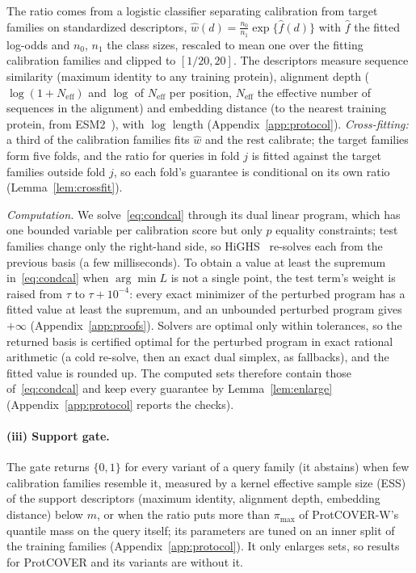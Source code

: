 The ratio comes from a logistic classifier separating calibration from target families on standardized descriptors, $\hat w(d)=\frac{n_0}{n_1}\exp\{\hat f(d)\}$ with $\hat f$ the fitted log-odds and $n_0$, $n_1$ the class sizes, rescaled to mean one over the fitting calibration families and clipped to $[1/20,20]$. The descriptors measure sequence similarity (maximum identity to any training protein), alignment depth ($\log(1+N_{\mathrm{eff}})$ and $\log$ of $N_{\mathrm{eff}}$ per position, $N_{\mathrm{eff}}$ the effective number of sequences in the alignment) and embedding distance (to the nearest training protein, from ESM2~\cite{lin2023evolutionary}), with $\log$ length (Appendix~\ref{app:protocol}). \emph{Cross-fitting:} a third of the calibration families fits $\hat w$ and the rest calibrate; the target families form five folds, and the ratio for queries in fold $j$ is fitted against the target families outside fold $j$, so each fold's guarantee is conditional on its own ratio (Lemma~\ref{lem:crossfit}).

\emph{Computation.} We solve~\eqref{eq:condcal} through its dual linear program, which has one bounded variable per calibration score but only $p$ equality constraints; test families change only the right-hand side, so HiGHS~\cite{huangfu2018parallelizing} re-solves each from the previous basis (a few milliseconds). To obtain a value at least the supremum in~\eqref{eq:condcal} when $\arg\min L$ is not a single point, the test term's weight is raised from $\tau$ to $\tau+10^{-4}$: every exact minimizer of the perturbed program has a fitted value at least the supremum, and an unbounded perturbed program gives $+\infty$ (Appendix~\ref{app:proofs}). Solvers are optimal only within tolerances, so the returned basis is certified optimal for the perturbed program in exact rational arithmetic (a cold re-solve, then an exact dual simplex, as fallbacks), and the fitted value is rounded up. The computed sets therefore contain those of~\eqref{eq:condcal} and keep every guarantee by Lemma~\ref{lem:enlarge} (Appendix~\ref{app:protocol} reports the checks).

\paragraph{(iii) Support gate.}
The gate returns $\{0,1\}$ for every variant of a query family (it abstains) when few calibration families resemble it, measured by a kernel effective sample size (ESS) of the support descriptors (maximum identity, alignment depth, embedding distance) below $m$, or when the ratio puts more than $\pi_{\max}$ of ProtCOVER-W's quantile mass on the query itself; its parameters are tuned on an inner split of the training families (Appendix~\ref{app:protocol}). It only enlarges sets, so results for ProtCOVER and its variants are without it.

